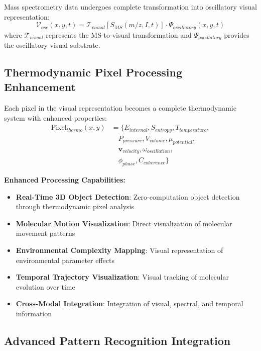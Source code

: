 \begin{definition}
Mass spectrometry data undergoes complete transformation into oscillatory visual representation:
$$\mathcal{V}_{osc}(x, y, t) = \mathcal{T}_{visual}[S_{MS}(m/z, I, t)] \cdot \Psi_{oscillatory}(x, y, t)$$
where $\mathcal{T}_{visual}$ represents the MS-to-visual transformation and $\Psi_{oscillatory}$ provides the oscillatory visual substrate.
\end{definition}

\subsection{Thermodynamic Pixel Processing Enhancement}

\begin{definition}
Each pixel in the visual representation becomes a complete thermodynamic system with enhanced properties:
\begin{align}
\text{Pixel}_{thermo}(x,y) &= \{E_{internal}, S_{entropy}, T_{temperature}, \\
&\quad P_{pressure}, V_{volume}, \mu_{potential}, \\
&\quad \mathbf{v}_{velocity}, \omega_{oscillation}, \\
&\quad \phi_{phase}, C_{coherence}\}
\end{align}
\end{definition}

\textbf{Enhanced Processing Capabilities:}
\begin{itemize}
\item \textbf{Real-Time 3D Object Detection}: Zero-computation object detection through thermodynamic pixel analysis
\item \textbf{Molecular Motion Visualization}: Direct visualization of molecular movement patterns
\item \textbf{Environmental Complexity Mapping}: Visual representation of environmental parameter effects
\item \textbf{Temporal Trajectory Visualization}: Visual tracking of molecular evolution over time
\item \textbf{Cross-Modal Integration}: Integration of visual, spectral, and temporal information
\end{itemize}

\subsection{Advanced Pattern Recognition Integration}

